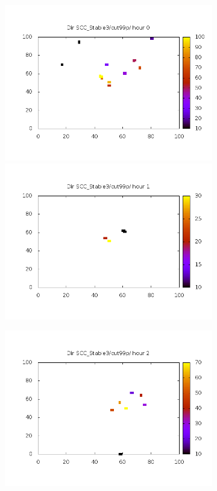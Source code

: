 \documentclass[10pt,a4paper]{article}
\begin{document}
\begin{figure}
\centering
\begin{subfigure}[b]{1\textwidth}
\includegraphics[scale=.4]{./img/SCC_Stable3/cut99p/0.png}
\includegraphics[scale=.4]{./img/SCC_Stable3/cut99p/1.png}
\end{subfigure}
\begin{subfigure}[b]{1\textwidth}
\includegraphics[scale=.4]{./img/SCC_Stable3/cut99p/2.png}

\end{subfigure}
\end{figure}
\end{document}

